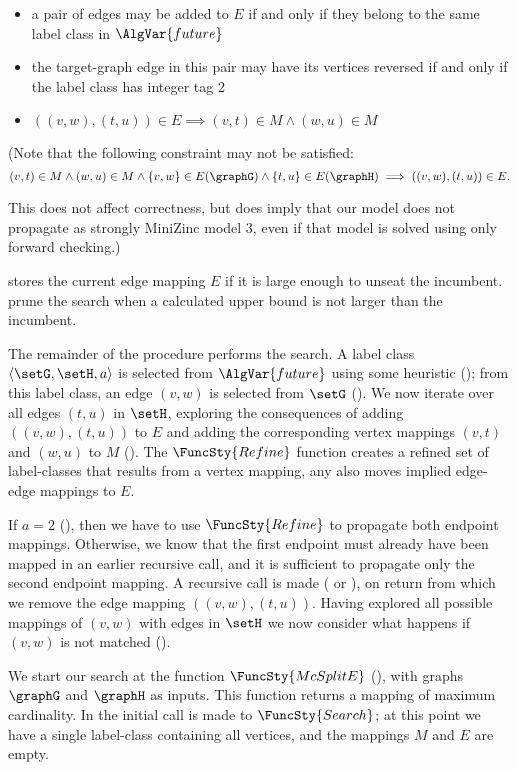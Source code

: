 \begin{itemize}
    \item a pair of edges may be added to $E$ if and only if they belong to the same label class in $\AlgVar{future}$
    \item the target-graph edge in this pair may have its vertices reversed if and only if the label class has integer tag 2
    \item $((v,w),(t,u)) \in E \implies (v,t) \in M \wedge (w,u) \in M$ 
\end{itemize}

(Note that the following constraint may not be satisfied:
\[
(v,t) \in M \wedge (w,u) \in M \wedge \{v,w\} \in E(\graphG) \wedge \{t,u\} \in E(\graphH) \implies ((v,w),(t,u)) \in E.
\]

This does not affect correctness, but does imply that our model does not propagate as strongly MiniZinc model 3,
even if that model is solved using only forward checking.)

 stores the current edge mapping $E$ if it is large enough
to unseat the incumbent.   prune the
search when a calculated upper bound is not larger than the incumbent.

The remainder of the procedure performs the search.  A label class $\langle
\setG, \setH, a \rangle$ is selected from $\AlgVar{future}$ using some
heuristic (); from this label class, an edge $(v,w)$ is
selected from $\setG$ (). We now iterate over all edges
$(t,u)$ in $\setH$, exploring the consequences of adding $((v,w),(t,u))$ to $E$
and adding the corresponding vertex mappings $(v,t)$ and $(w,u)$ to $M$
().  The $\FuncSty{Refine}$ function
creates a refined set of label-classes that results from a vertex mapping,
any also moves implied edge-edge mappings to $E$.

If $a=2$ (), then we have to use $\FuncSty{Refine}$ to propagate
both endpoint mappings.  Otherwise, we know that the first endpoint must already have
been mapped in an earlier recursive call, and it is sufficient to propagate only the second
endpoint mapping.  
A recursive call is made ( or ),
on return from which we remove the edge mapping $((v,w),(t,u))$.
Having explored all possible mappings of $(v,w)$ with edges in $\setH$ we now
consider what happens if $(v,w)$ is not matched
().

We start our search at the function $\FuncSty{McSplitE}$ (),
with graphs $\graphG$ and $\graphH$ as inputs.  This function returns a mapping of
maximum cardinality.  In  the initial call is made to
$\FuncSty{Search}$; at this point we have a single label-class containing all
vertices, and the mappings $M$ and $E$ are empty.

